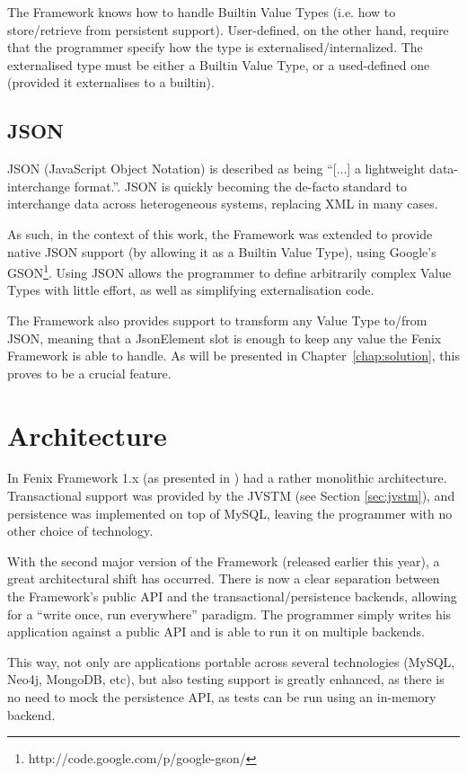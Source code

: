 The Framework knows how to handle Builtin Value Types (i.e. how to
store/retrieve from persistent support). User-defined, on the other
hand, require that the programmer specify how the type is
externalised/internalized. The externalised type must be either a
Builtin Value Type, or a used-defined one (provided it externalises to
a builtin).

\subsection{JSON}

JSON (JavaScript Object Notation) is described as being ``[...] a
lightweight data-interchange format.''. JSON is quickly becoming the
de-facto standard to interchange data across heterogeneous systems,
replacing XML in many cases.

As such, in the context of this work, the Framework was extended to
provide native JSON support (by allowing it as a Builtin Value Type),
using Google's GSON\footnote{http://code.google.com/p/google-gson/}.
Using JSON allows the programmer to define arbitrarily complex Value
Types with little effort, as well as simplifying externalisation code.

The Framework also provides support to transform any Value Type
to/from JSON, meaning that a JsonElement slot is enough to keep any
value the Fenix Framework is able to handle. As will be presented in
Chapter~\ref{chap:solution}, this proves to be a crucial feature.

\section{Architecture}
\label{sec:ff-arch}

In Fenix Framework 1.x (as presented in \cite{fernandes2011strict})
had a rather monolithic architecture. Transactional support was
provided by the JVSTM (see Section \ref{sec:jvstm}), and persistence
was implemented on top of MySQL, leaving the programmer with no other
choice of technology.

With the second major version of the Framework (released earlier this
year), a great architectural shift has occurred. There is now a clear
separation between the Framework's public API and the
transactional/persistence backends, allowing for a ``write once, run
everywhere'' paradigm. The programmer simply writes his application
against a public API and is able to run it on multiple backends.

This way, not only are applications portable across several
technologies (MySQL, Neo4j, MongoDB, etc), but also testing support is
greatly enhanced, as there is no need to mock the persistence API, as
tests can be run using an in-memory backend.

